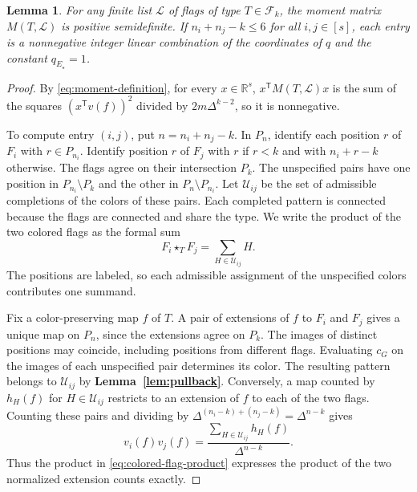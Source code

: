 \documentclass[preprint,11pt,numbers]{elsarticle-arxiv}
\numberwithin{equation}{section}
\newtheorem{lemma}[theorem]{Lemma}
\theoremstyle{definition}
\begin{document}
\begin{lemma}\label{lem:moment}
For any finite list $\mathcal L$ of flags of type $T\in\mathcal F_k$,
the moment matrix $M(T,\mathcal L)$ is positive semidefinite.
If $n_i+n_j-k\leq6$ for all $i,j\in[s]$, each entry is a nonnegative
integer linear combination of the coordinates of $q$ and the
constant $q_{E_\star}=1$.
\end{lemma}

\begin{proof}
By \eqref{eq:moment-definition}, for every $x\in\mathbb R^s$,
$x^{\mathsf T}M(T,\mathcal L)x$ is the sum of the squares
$(x^{\mathsf T}v(f))^2$ divided by $2m\Delta^{k-2}$, so it is
nonnegative.

To compute entry $(i,j)$, put $n=n_i+n_j-k$. In $P_n$, identify each position $r$ of $F_i$ with $r\in P_{n_i}$.
Identify position $r$ of $F_j$ with $r$ if $r<k$ and with $n_i+r-k$
otherwise. The flags agree on their intersection
$P_k$. The unspecified pairs have one position in
$P_{n_i}\setminus P_k$ and the other in $P_n\setminus P_{n_i}$.
Let $\mathcal U_{ij}$ be the set of admissible completions of the
colors of these pairs. Each completed pattern is connected because
the flags are connected and share the type. We write the product of
the two colored flags as the formal sum
\begin{equation}\label{eq:colored-flag-product}
 F_i\star_T F_j=\sum_{H\in\mathcal U_{ij}}H.
\end{equation}
The positions are labeled, so each admissible assignment of
the unspecified colors contributes one summand.

Fix a color-preserving map $f$ of $T$. A pair of extensions of $f$
to $F_i$ and $F_j$ gives a unique map on $P_n$, since the extensions
agree on $P_k$. The images of distinct positions may coincide,
including positions from different flags. Evaluating $c_G$ on the
images of each unspecified pair determines its color. The resulting
pattern belongs to $\mathcal U_{ij}$ by
\textbf{Lemma~\ref{lem:pullback}}. Conversely, a map counted by
$h_H(f)$ for $H\in\mathcal U_{ij}$ restricts to an extension of $f$
to each of the two flags. Counting these pairs and dividing by
$\Delta^{(n_i-k)+(n_j-k)}=\Delta^{n-k}$ gives
\begin{equation}\label{eq:colored-flag-evaluation}
 v_i(f)v_j(f)=\frac{\displaystyle\sum_{H\in\mathcal U_{ij}}h_H(f)}
                         {\Delta^{n-k}}.
\end{equation}
Thus the product in \eqref{eq:colored-flag-product} expresses the
product of the two normalized extension counts exactly.


\end{proof}
\end{document}
